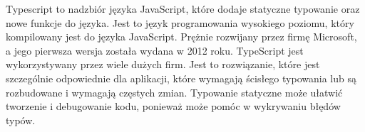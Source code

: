 Typescript to nadzbiór języka JavaScript, które dodaje statyczne typowanie oraz nowe funkcje do języka. Jest to język programowania wysokiego poziomu, który kompilowany jest do języka JavaScript. Prężnie rozwijany przez  firmę Microsoft, a jego pierwsza wersja została wydana w 2012 roku. TypeScript jest wykorzystywany przez wiele dużych firm. Jest to rozwiązanie, które jest szczególnie odpowiednie dla aplikacji, które wymagają ścisłego typowania lub są rozbudowane i wymagają częstych zmian. Typowanie statyczne może ułatwić tworzenie i debugowanie kodu, ponieważ może pomóc w wykrywaniu błędów typów. \autocite{typescript}
